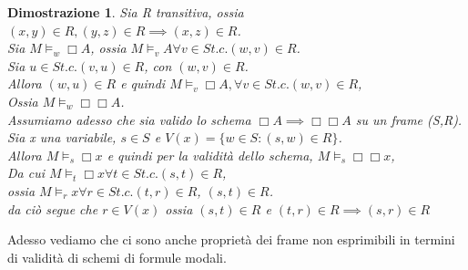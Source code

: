 \documentclass[a4paper,12pt]{article}
\theoremstyle{def}
\theoremstyle{prop}
\theoremstyle{esempio}
\theoremstyle{dimostrazione}
\newtheorem*{dimostrazione}{Dimostrazione}
\theoremstyle{teo}
\theoremstyle{osservazione}
\begin{document}
\begin{dimostrazione}
	Sia R transitiva, ossia \((x,y) \in R, (y,z) \in R \implies (x,z) \in R\).\\
	Sia \(M \vDash_w \Box A\), ossia \(M \vDash_v A \forall v \in S t.c. (w,v) \in R\).\\
	Sia \(u \in S t.c. (v,u) \in R\), con \((w,v) \in R\).\\
	Allora \((w,u) \in R\) e quindi \(M \vDash_v \Box A, \forall v \in S t.c. (w,v) \in R\),\\
	Ossia \(M \vDash_w \Box \Box A\).\\
	Assumiamo adesso che sia valido lo schema \(\Box A \implies \Box \Box A\) su un frame (S,R).\\
	Sia x una variabile, \(s \in S\) e \(V(x) = \{w \in S : (s,w) \in R\}\).\\
	Allora \(M \vDash_s \Box x\) e quindi per la validità dello schema, \(M \vDash_s \Box \Box x \),\\
	Da cui \(M \vDash_t \Box x \forall t \in S t.c. (s,t) \in R\),\\
	ossia \(M \vDash_r x \forall r \in S t.c. (t,r) \in R\), \((s,t) \in R\).\\
	da ciò segue che \(r \in V(x)\) ossia \((s,t) \in R\) e \((t,r) \in R \implies (s,r) \in R\)\\
\end{dimostrazione}
Adesso vediamo che ci sono anche proprietà dei frame non esprimibili in termini di validità di schemi di formule modali.\\
\newpage
\end{document}
